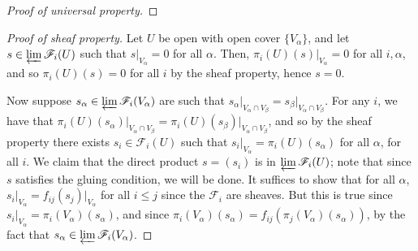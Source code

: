 \documentclass[12pt,letterpaper]{article}
\theoremstyle{definition}
\theoremstyle{remark}
\numberwithin{equation}{section}
\numberwithin{figure}{problem}
\begin{document}
\begin{proof}[Proof of universal property]
\end{proof}
\begin{proof}[Proof of sheaf property]
  Let $U$ be open with open cover $\{V_\alpha\}$, and let $s \in \varprojlim\mathscr{F}_i(U)$ such that $s\vert_{V_\alpha} = 0$ for all $\alpha$. Then, $\pi_i(U)(s)\vert_{V_\alpha} = 0$ for all $i,\alpha$, and so $\pi_i(U)(s) = 0$ for all $i$ by the sheaf property, hence $s = 0$.
  \par Now suppose $s_\alpha \in \varprojlim\mathscr{F}_i(V_\alpha)$ are such that $s_\alpha\vert_{V_\alpha \cap V_\beta} = s_\beta\vert_{V_\alpha \cap V_\beta}$. For any $i$, we have that $\pi_i(U)(s_\alpha)\vert_{V_\alpha\cap V_\beta} = \pi_i(U)(s_\beta)\vert_{V_\alpha \cap V_\beta}$, and so by the sheaf property there exists $s_i \in \mathscr{F}_i(U)$ such that $s_i\vert_{V_\alpha} = \pi_i(U)(s_\alpha)$ for all $\alpha$, for all $i$. We claim that the direct product $s = (s_i)$ is in $\varprojlim\mathscr{F}_i(U)$; note that since $s$ satisfies the gluing condition, we will be done. It suffices to show that for all $\alpha$, $s_i\vert_{V_\alpha} = f_{ij}(s_j)\vert_{V_\alpha}$ for all $i \le j$ since the $\mathscr{F}_i$ are sheaves. But this is true since $s_i\vert_{V_\alpha} = \pi_i(V_\alpha)(s_\alpha)$, and since $\pi_i(V_\alpha)(s_\alpha) = f_{ij}(\pi_j(V_\alpha)(s_\alpha))$, by the fact that $s_\alpha \in \varprojlim\mathscr{F}_i(V_\alpha)$.
\end{proof}
\end{document}
